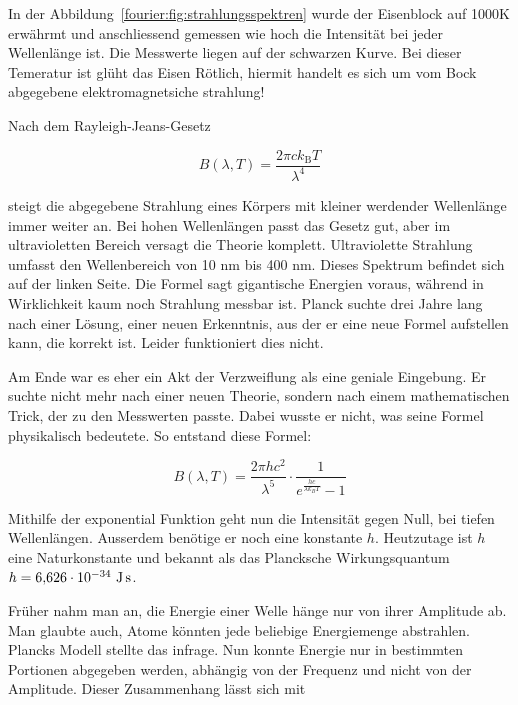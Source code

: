 	
	
	In der Abbildung~\ref{fourier:fig:strahlungsspektren} wurde der Eisenblock auf 1000K erwährmt und anschliessend gemessen wie hoch die Intensität bei jeder Wellenlänge ist. 
	Die Messwerte liegen auf der schwarzen Kurve.
	Bei dieser Temeratur ist glüht das Eisen Rötlich, hiermit handelt es sich um vom Bock abgegebene elektromagnetsiche strahlung!
	
	
	Nach dem Rayleigh-Jeans-Gesetz 
	
	\begin{equation}
		B(\lambda, T) = \frac{2 \pi c k_\mathrm{B} T}{\lambda^4}
	\end{equation}
	
	steigt die abgegebene Strahlung eines Körpers mit kleiner werdender Wellenlänge immer weiter an. 
	Bei hohen Wellenlängen passt das Gesetz gut, aber im ultravioletten Bereich versagt die Theorie komplett. Ultraviolette Strahlung umfasst den Wellenbereich von 10 nm bis 400 nm. 
	Dieses Spektrum befindet sich auf der linken Seite.
	Die Formel sagt gigantische Energien voraus, während in Wirklichkeit kaum noch Strahlung messbar ist.
	Planck suchte drei Jahre lang nach einer Lösung, einer neuen Erkenntnis, aus der er eine neue Formel aufstellen kann, die korrekt ist. 
	Leider funktioniert dies nicht.
	
	
	Am Ende war es eher ein Akt der Verzweiflung als eine geniale Eingebung. Er suchte nicht mehr nach einer neuen Theorie, sondern nach einem mathematischen Trick, der zu den Messwerten passte. 
	Dabei wusste er nicht, was seine Formel physikalisch bedeutete.
	So entstand diese Formel: 
	
	\begin{equation}
		B(\lambda, T) = \frac{2 \pi h c^2}{\lambda^5} \cdot \frac{1}{e^{\frac{h c}{\lambda k_B T}} - 1}
	\end{equation}
	
	Mithilfe der exponential Funktion geht nun die Intensität gegen Null, bei tiefen Wellenlängen. Ausserdem benötige er noch eine konstante $h$. Heutzutage ist $h$ eine Naturkonstante und bekannt als das Plancksche Wirkungsquantum $h = 6{,}626 \cdot 10^{-34} \ \text{J\,s}$. 
	


	
	
	
	Früher nahm man an, die Energie einer Welle hänge nur von ihrer Amplitude ab. 
	Man glaubte auch, Atome könnten jede beliebige Energiemenge abstrahlen. 
	Plancks Modell stellte das infrage. 
	Nun konnte Energie nur in bestimmten Portionen abgegeben werden, abhängig von der Frequenz und nicht von der Amplitude. 
	Dieser Zusammenhang lässt sich mit
	

